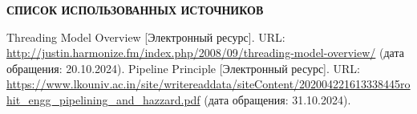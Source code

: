 \renewcommand{\bibname}{}
\begin{thebibliography}{6}
\renewcommand{\bibname}{СПИСОК ИСПОЛЬЗОВАННЫХ ИСТОЧНИКОВ}
\begin{center}
    \textbf{\bibname}
\end{center}
     Threading Model Overview [Электронный ресурс]. URL: \url{http://justin.harmonize.fm/index.php/2008/09/threading-model-overview/} (дата обращения: 20.10.2024).
	Pipeline Principle [Электронный ресурс]. URL: \url{https://www.lkouniv.ac.in/site/writereaddata/siteContent/202004221613338445rohit_engg_pipelining_and_hazzard.pdf} (дата обращения: 31.10.2024).
\end{thebibliography}
